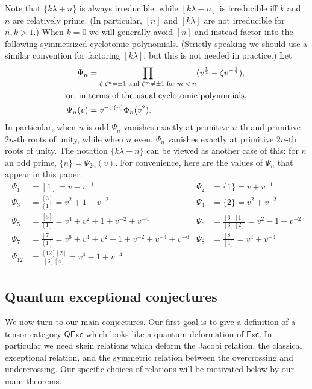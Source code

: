 \documentclass[12pt]{amsart}
\begin{document}
Note that $\{k\lambda + n\}$ is always irreducible, while $[k\lambda +
n]$ is irreducible iff $k$ and~$n$ are relatively prime. (In
particular, $[n]$ and $[k\lambda]$ are not irreducible for $n,k>1$.)
When
$k=0$ we will generally avoid $[n]$ and instead factor into the following
symmetrized cyclotomic polynomials.  (Strictly speaking we should use
a similar convention for factoring $[k \lambda]$, but this is not needed
in practice.)  Let
\begin{align*}
  \Psi_n &= \prod_{\zeta: \zeta^{n} = \pm 1 \text{ and } \zeta^m \neq \pm 1 \text{ for $m < n$}}
  (v^{\frac{1}{2}}-\zeta v^{-\frac{1}{2}}),\\
  \intertext{or, in terms of the usual cyclotomic polynomials,}
  \Psi_n(v) &= v^{-\varphi(n)} \Phi_{n}(v^2).
\end{align*}
In particular, when $n$ is odd $\Psi_n$ vanishes exactly at primitive
$n$-th and primitive $2n$-th roots of unity, while when $n$ even,
$\Psi_n$ vanishes exactly at primitive $2n$-th roots of unity.
The notation $\{k\lambda + n\}$ can be viewed as another case of this:
for $n$ an odd prime,
$\{n\} = \Psi_{2n}(v)$. For convenience, here are the values of $\Psi_n$ that
appear in this paper.
\begin{align*}
  \Psi_1 & = [1] = v - v^{-1} &
  \Psi_2 & = \{1\} = v + v^{-1}\\
  \Psi_3 & = \frac{[3]}{[1]} = v^2 + 1 + v^{-2}&
  \Psi_4 & = \{2\} = v^2 + v^{-2}\\
  \Psi_5 & = \frac{[5]}{[1]} = v^4 + v^2 + 1 + v^{-2} + v^{-4}&
  \Psi_6 & = \frac{[6][1]}{[3][2]} = v^2 - 1 + v^{-2}\\
  \Psi_7 & = \frac{[7]}{[1]} = v^6 + v^4 + v^2 + 1 + v^{-2} + v^{-4} + v^{-6} &
  \Psi_8 & = \frac{[8]}{[4]} = v^4 + v^{-4} \\
  \Psi_{12} & = \frac{[12][2]}{[6][4]} = v^4 - 1 + v^{-4} \\
\end{align*}
\subsection{Quantum exceptional conjectures}
\label{sec:intro-quantum}
We now turn to our main conjectures.  Our first goal is to give a definition
of a tensor category $\mathsf{QExc}$ which looks like a quantum deformation of
$\mathsf{Exc}$. In particular we need skein relations which deform the Jacobi
relation, the classical exceptional relation, and the symmetric relation
between the overcrossing and undercrossing.  Our specific choices of relations
will be motivated below by our main theorems.
\end{document}
